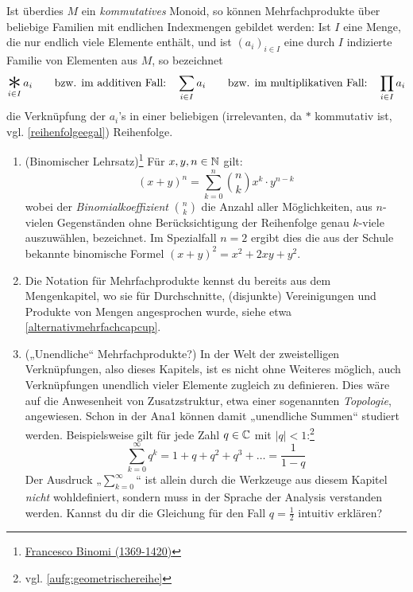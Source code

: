 \begin{nota}[Mehrfachprodukte]
    Ist überdies $M$ ein \emph{kommutatives} Monoid, so können Mehrfachprodukte über beliebige Familien mit endlichen Indexmengen gebildet werden: Ist $I$ eine Menge, die nur endlich viele Elemente enthält, und ist $(a_i)_{i\in I}$ eine durch $I$ indizierte Familie von Elementen aus $M$, so bezeichnet
        \[ \mathop{\raisebox{-0.6ex}{\scalebox{2.5}{$*$}}}_{i\in I} a_i \qquad\text{bzw. im additiven Fall:}\quad \sum_{i\in I} a_i \qquad\text{bzw. im multiplikativen Fall:}\quad \prod_{i\in I} a_i\]
    die Verknüpfung der $a_i$'s in einer beliebigen (irrelevanten, da $*$ kommutativ ist, vgl. \cref{reihenfolgeegal}) Reihenfolge.
\end{nota}


\begin{bsp} \quad
    \begin{enumerate}
        \item(Binomischer Lehrsatz)\footnote{\href{https://www.youtube.com/watch?v=dQw4w9WgXcQ}{Francesco Binomi (1369-1420)}} Für $x,y,n\in \mathbb N$ gilt:
            \[ (x+y)^n = \sum_{k=0}^n \binom{n}{k} x^k\cdot y^{n-k} \]
        wobei der \emph{Binomialkoeffizient} $\binom{n}{k}$ die Anzahl aller Möglichkeiten, aus $n$-vielen Gegenständen ohne Berücksichtigung der Reihenfolge genau $k$-viele auszuwählen, bezeichnet. Im Spezialfall $n=2$ ergibt dies die aus der Schule bekannte binomische Formel $(x+y)^2=x^2+2xy+y^2$.
        \item Die Notation für Mehrfachprodukte kennst du bereits aus dem Mengenkapitel, wo sie für Durchschnitte, (disjunkte) Vereinigungen und Produkte von Mengen angesprochen wurde, siehe etwa \cref{alternativmehrfachcapcup}.
        \item(„Unendliche“ Mehrfachprodukte?) In der Welt der zweistelligen Verknüpfungen, also dieses Kapitels, ist es nicht ohne Weiteres möglich, auch Verknüpfungen unendlich vieler Elemente zugleich zu definieren. Dies wäre auf die Anwesenheit von Zusatzstruktur, etwa einer sogenannten \emph{Topologie}, angewiesen. Schon in der Ana1 können damit „unendliche Summen“ studiert werden. Beispielsweise gilt für jede Zahl $q\in \mathbb C$ mit $\vert q\vert < 1$:\footnote{vgl. \cref{aufg:geometrischereihe}}
            \[ \sum_{k=0}^\infty q^k = 1 + q + q^2 + q^3 + \ldots = \frac{1}{1-q} \]
        Der Ausdruck „$\sum_{k=0}^\infty$“ ist allein durch die Werkzeuge aus diesem Kapitel \emph{nicht} wohldefiniert, sondern muss in der Sprache der Analysis verstanden werden. Kannst du dir die Gleichung für den Fall $q=\frac{1}{2}$ intuitiv erklären?
    \end{enumerate}
\end{bsp}





